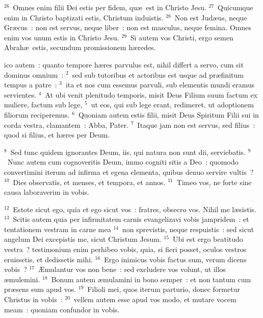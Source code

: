 ${}^{26}$~Omnes enim filii Dei estis per fidem, qu\ae\ est in Christo Jesu.
${}^{27}$~Quicumque enim in Christo baptizati estis, Christum induistis.
${}^{28}$~Non est Jud\ae us, neque Gr\ae cus~: non est servus, neque liber~: non est masculus, neque femina. Omnes enim vos unum estis in Christo Jesu.
${}^{29}$~Si autem vos Christi, ergo semen Abrah\ae\ estis, secundum promissionem h\ae redes.

\bchapter
{}ico autem~: quanto tempore h\ae res parvulus est, nihil differt a servo, cum sit dominus omnium~:
${}^{2}$~sed sub tutoribus et actoribus est usque ad pr\ae finitum tempus a patre~:
${}^{3}$~ita et nos cum essemus parvuli, sub elementis mundi eramus servientes.
${}^{4}$~At ubi venit plenitudo temporis, misit Deus Filium suum factum ex muliere, factum sub lege,
${}^{5}$~ut eos, qui sub lege erant, redimeret, ut adoptionem filiorum reciperemus.
${}^{6}$~Quoniam autem estis filii, misit Deus Spiritum Filii sui in corda vestra, clamantem~: Abba, Pater.
${}^{7}$~Itaque jam non est servus, sed filius~: quod si filius, et h\ae res per Deum.


${}^{8}$~Sed tunc quidem ignorantes Deum, iis, qui natura non sunt dii, serviebatis.
${}^{9}$~Nunc autem cum cognoveritis Deum, immo cogniti sitis a Deo~: quomodo convertimini iterum ad infirma et egena elementa, quibus denuo servire vultis~?
${}^{10}$~Dies observatis, et menses, et tempora, et annos.
${}^{11}$~Timeo vos, ne forte sine causa laboraverim in vobis.


${}^{12}$~Estote sicut ego, quia et ego sicut vos~: fratres, obsecro vos. Nihil me l\ae sistis.
${}^{13}$~Scitis autem quia per infirmitatem carnis evangelizavi vobis jampridem~: et tentationem vestram in carne mea
${}^{14}$~non sprevistis, neque respuistis~: sed sicut angelum Dei excepistis me, sicut Christum Jesum.
${}^{15}$~Ubi est ergo beatitudo vestra~? testimonium enim perhibeo vobis, quia, si fieri posset, oculos vestros eruissetis, et dedissetis mihi.
${}^{16}$~Ergo inimicus vobis factus sum, verum dicens vobis~?
${}^{17}$~\AE mulantur vos non bene~: sed excludere vos volunt, ut illos \ae mulemini.
${}^{18}$~Bonum autem \ae mulamini in bono semper~: et non tantum cum pr\ae sens sum apud vos.
${}^{19}$~Filioli mei, quos iterum parturio, donec formetur Christus in vobis~:
${}^{20}$~vellem autem esse apud vos modo, et mutare vocem meam~: quoniam confundor in vobis.



